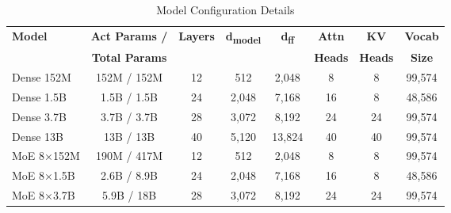 \begin{table}[t]
\caption{Model Configuration Details}
\label{tab:model-details}
\centering
\small
\begin{tabular}{lccccccc}
\toprule
\textbf{Model} & \textbf{Act Params /} & 
\textbf{Layers} & \textbf{d\textsubscript{model}} & \textbf{d\textsubscript{ff}} & \textbf{Attn} & \textbf{KV} & \textbf{Vocab} \\
 & \textbf{Total Params} & & & & \textbf{Heads} & \textbf{Heads} & \textbf{Size} \\
\midrule
Dense 152M & 152M / 152M & 12 & 512 & 2,048 & 8 & 8 & 99,574 \\
Dense 1.5B & 1.5B / 1.5B & 24 & 2,048 & 7,168 & 16 & 8 & 48,586 \\
Dense 3.7B & 3.7B / 3.7B & 28 & 3,072 & 8,192 & 24 & 24 & 99,574 \\
Dense 13B & 13B / 13B & 40 & 5,120 & 13,824 & 40 & 40 & 99,574 \\
\midrule
MoE 8×152M & 190M / 417M & 12 & 512 & 2,048 & 8 & 8 & 99,574 \\
MoE 8×1.5B & 2.6B / 8.9B & 24 & 2,048 & 7,168 & 16 & 8 & 48,586 \\
MoE 8×3.7B & 5.9B / 18B & 28 & 3,072 & 8,192 & 24 & 24 & 99,574 \\
\bottomrule
\end{tabular}
\end{table}


